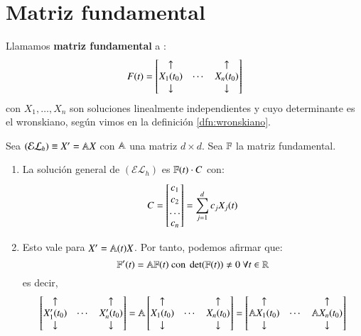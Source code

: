 \section{Matriz fundamental}
\begin{dfn}
    Llamamos \textbf{matriz fundamental} a :
   $$
    F(t) = \mx{\uparrow && \uparrow\\ X_1(t_0) & \cdots & X_n(t_0) \\ \downarrow && \downarrow}
   $$
   con $X_1, \ldots, X_n$ son soluciones linealmente independientes y cuyo determinante es el wronskiano, según vimos en la definición \ref{dfn:wronskiano}.
\end{dfn}
\begin{obs}
    Sea $(\mathcal{EL}_h) \equiv X' = \mathbb{A} X$ con $\mathbb{A}$ una matriz $d\times d$. Sea $\mathbb{F}$ la matriz fundamental.\\
    \begin{enumerate}
        \item La solución general de $(\mathcal{EL}_h)$ es $\mathbb{F}(t) \cdot C$ con:\label{obs:sol-gen-fund}
        $$
            C = \mx{c_1\\c_2\\\ldots\\c_n} = \sum_{j=1}^d c_jX_j(t)
        $$
        \item Esto vale para $X' = \mathbb{A}(t) X$. Por tanto, podemos afirmar que:
        $$
            \mathbb{F}'(t) = \mathbb{A} \mathbb{F}(t) \text{ con } \det(\mathbb{F}(t)) \neq 0\ \forall t\in \mathbb{R}
        $$
        es decir,
        $$
             \mx{\uparrow && \uparrow\\ X_1'(t_0) & \cdots & X_n'(t_0) \\ \downarrow && \downarrow} = \A  \mx{\uparrow && \uparrow\\ X_1(t_0) & \cdots & X_n(t_0) \\ \downarrow && \downarrow} =  \mx{\uparrow && \uparrow\\ \A X_1(t_0) & \cdots & \A X_n(t_0) \\ \downarrow && \downarrow}
        $$
    \end{enumerate}
\end{obs}


